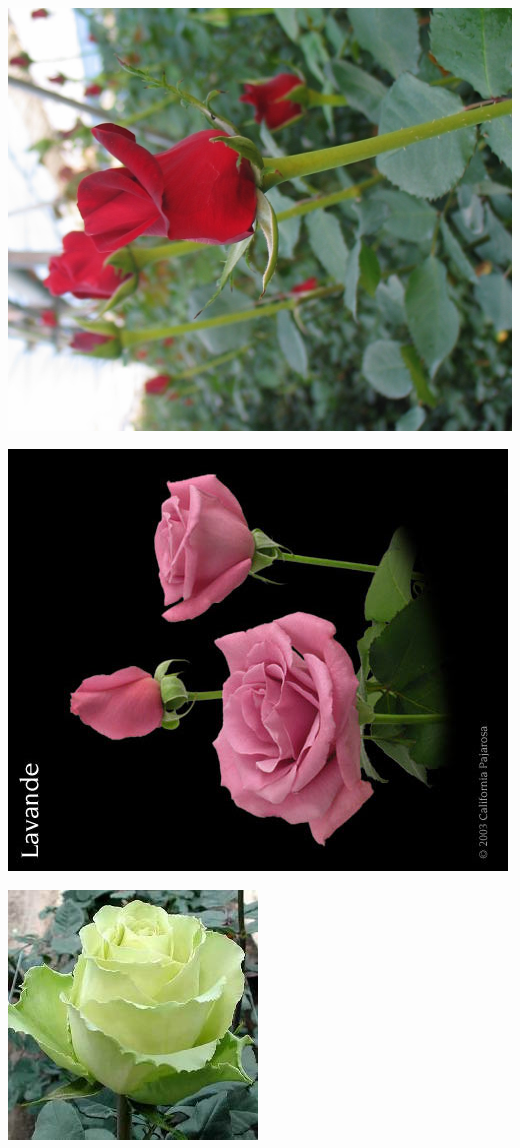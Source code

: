 \documentclass{article}
\begin{document}
\begin{center}
\includegraphics[height=0.925\paperheight]{../Rose_Kardinal.jpg}
\end{center}
\newpage

\begin{center}
\includegraphics[height=0.925\paperheight]{../Rose_Lavande.jpg}
\end{center}
\newpage

\begin{center}
\includegraphics[height=0.925\paperheight]{../Rose_Limbo_Green.jpg}
\end{center}
\newpage
\end{document}
